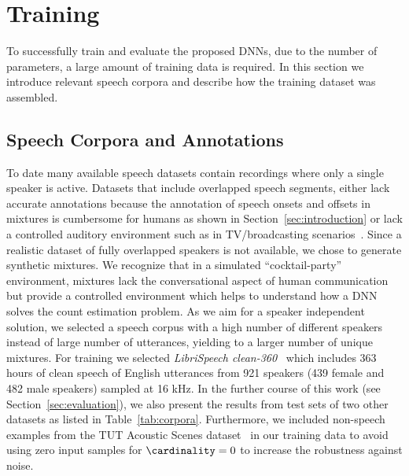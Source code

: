 \section{Training}%
\label{sec:training}

To successfully train and evaluate the proposed DNNs, due to the number of parameters, a large amount of training data is required.
In this section we introduce relevant speech corpora and describe how the training dataset was assembled.

\subsection{Speech Corpora and Annotations}%
\label{ssec:corpus}
To date many available speech datasets contain recordings where only a single speaker is active.
Datasets that include overlapped speech segments, either lack accurate annotations because the annotation of speech onsets and offsets in mixtures is cumbersome for humans as shown in Section~\ref{sec:introduction} or lack a controlled auditory environment such as in TV/broadcasting scenarios~\cite{Gravier12}.
Since a realistic dataset of fully overlapped speakers is not available, we  chose to generate synthetic mixtures.
We recognize that in a simulated ``cocktail-party'' environment, mixtures lack the conversational aspect of human communication but provide a controlled environment which helps to understand how a DNN solves the count estimation problem.
As we aim for a speaker independent solution, we selected a speech corpus with a high number of different speakers instead of large number of utterances, yielding to a larger number of unique mixtures.
For training we selected \emph{LibriSpeech clean-360}\ \cite{panayotov15} which includes 363 hours of clean speech of English utterances from 921 speakers (439 female and 482 male speakers) sampled at 16 kHz.
In the further course of this work (see Section~\ref{sec:evaluation}), we also present the results from test sets of two other datasets as listed in Table~\ref{tab:corpora}.
Furthermore, we included non-speech examples from the TUT Acoustic Scenes dataset~\cite{Mesaros16} in our training data to avoid using zero input samples for \(\cardinality = 0\) to increase the robustness against noise.

